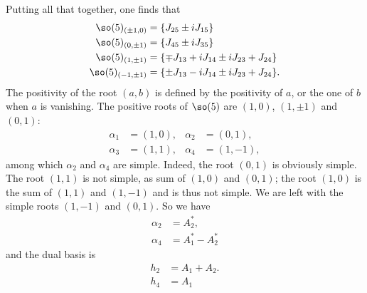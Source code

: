 Putting all that together, one finds that
\begin{subequations}		\label{EqRootSOImpaircinq}
	\begin{align}
		\so(5)_{(\pm 1,0)}	&=\{ J_{25}\pm iJ_{15} \}\\
		\so(5)_{(0,\pm 1)}	&=\{ J_{45}\pm iJ_{35} \}\\
		\so(5)_{(1,\pm 1)}	&=\{ \mp J_{13}+iJ_{14}\pm iJ_{23}+J_{24} \}\\
		\so(5)_{(-1,\pm 1)}	&=\{ \pm J_{13}-iJ_{14}\pm iJ_{23}+J_{24} \}.
	\end{align}
\end{subequations}
The positivity of the root $(a,b)$ is defined by the positivity of $a$, or the one of $b$ when $a$ is vanishing. The positive roots of $\so(5)$ are $(1,0)$, $(1,\pm 1)$ and $(0,1)$:
\begin{equation}
	\begin{aligned}
		\alpha_1&=(1,0),	&\alpha_2&=(0,1),\\
		\alpha_3&=(1,1),	&\alpha_4&=(1,-1),
	\end{aligned}
\end{equation}
among which $\alpha_2$ and $\alpha_4$ are simple. Indeed, the root $(0,1)$ is obviously simple. The root $(1,1)$ is not simple, as sum of $(1,0)$ and $(0,1)$; the root $(1,0)$ is the sum of $(1,1)$ and $(1,-1)$ and is thus not simple. We are left with the simple roots $(1,-1)$ and $(0,1)$. So we have
\begin{subequations}
	\begin{align}
		\alpha_2	&=A_2^*,\\
		\alpha_4	&=A_1^*-A_2^*
	\end{align}
\end{subequations}
and the dual basis is
\begin{subequations}
	\begin{align}
		h_2	&=A_1+A_2.\\
		h_4	&=A_1
	\end{align}
\end{subequations}

